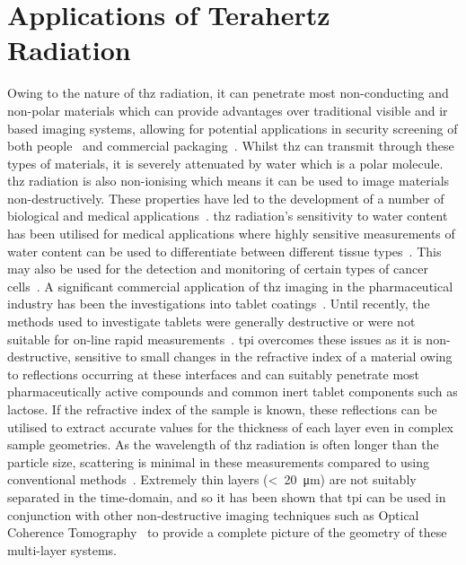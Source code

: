 \section{Applications of Terahertz Radiation}
Owing to the nature of \acrshort{thz} radiation, it can penetrate most non\nobreakdash-conducting and non\nobreakdash-polar materials which can provide advantages over traditional visible and \acrshort{ir} based imaging systems, allowing for potential applications in security screening of both people~\cite{Appleby2007} and commercial packaging~\cite{Federici2005}.
Whilst \acrshort{thz} can transmit through these types of materials, it is severely attenuated by water which is a polar molecule. \acrshort{thz} radiation is also non\nobreakdash-ionising which means it can be used to image materials non\nobreakdash-destructively. These properties have led to the development of a number of biological and medical applications~\cite{Wu2019, Goretti2022, Chen2021, Osman2020, Ruan2019}.
\acrshort{thz} radiation's sensitivity to water content has been utilised for medical applications where highly sensitive measurements of water content can be used to differentiate between different tissue types~\cite{Bennett2011}. This may also be used for the detection and monitoring of certain types of cancer cells~\cite{Yu2012}. 
A significant commercial application of \acrshort{thz} imaging in the pharmaceutical industry has been the investigations into tablet coatings~\cite{Ho2008}. Until recently, the methods used to investigate tablets were generally destructive or were not suitable for on\nobreakdash-line rapid measurements~\cite{Mowery2002}. \acrfull{tpi} overcomes these issues as it is non\nobreakdash-destructive, sensitive to small changes in the refractive index of a material owing to reflections occurring at these interfaces and can suitably penetrate most pharmaceutically active compounds and common inert tablet components such as lactose. If the refractive index of the sample is known, these reflections can be utilised to extract accurate values for the thickness of each layer even in complex sample geometries. As the wavelength of \acrshort{thz} radiation is often longer than the particle size, scattering is minimal in these measurements compared to using conventional methods~\cite{Korasa2018}. Extremely thin layers (<~\SI{20}{\micro\metre}) are not suitably separated in the time\nobreakdash-domain, and so it has been shown that \acrshort{tpi} can be used in conjunction with other non-destructive imaging techniques such as Optical Coherence Tomography~\cite{Lin2017} to provide a complete picture of the geometry of these multi-layer systems. 

